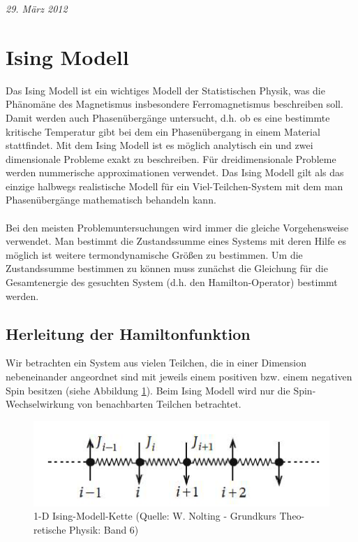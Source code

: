 
\usepackage{amsmath} 





\textit{29. März 2012}


\section*{Ising Modell}

Das Ising Modell ist ein wichtiges Modell der Statistischen Physik, was die Phänomäne des Magnetismus insbesondere Ferromagnetismus beschreiben soll. Damit werden auch Phasenübergänge untersucht, d.h. ob es eine bestimmte kritische Temperatur gibt bei dem ein Phasenübergang in einem Material stattfindet. Mit dem Ising Modell ist es möglich analytisch ein und zwei dimensionale Probleme exakt zu beschreiben. Für dreidimensionale Probleme werden nummerische approximationen verwendet. Das Ising Modell gilt als das einzige halbwegs realistische Modell für ein Viel-Teilchen-System mit dem man Phasenübergänge mathematisch behandeln kann.\\
\\
Bei den meisten Problemuntersuchungen wird immer die gleiche Vorgehensweise verwendet. Man bestimmt die Zustandssumme eines Systems mit deren Hilfe es möglich ist weitere termondynamische Größen zu bestimmen. Um die Zustandssumme bestimmen zu können muss zunächst die Gleichung für  die Gesamtenergie des gesuchten System (d.h. den Hamilton-Operator) bestimmt werden.

\subsection*{Herleitung der Hamiltonfunktion}

Wir betrachten ein System aus vielen Teilchen, die in einer Dimension nebeneinander angeordnet sind mit jeweils einem positiven bzw. einem negativen Spin besitzen (siehe Abbildung \ref{fig:1}). Beim Ising Modell wird nur die Spin-Wechselwirkung von benachbarten Teilchen betrachtet.


\begin{figure}
  \centering
  \includegraphics[scale=0.5]{./ising-pics/ising01.png}
  \caption{1-D Ising-Modell-Kette (Quelle: W. Nolting - Grundkurs Theo-
retische Physik: Band 6)
}
  \label{fig:1}
\end{figure}



